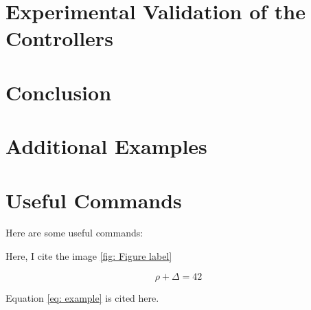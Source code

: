 \documentclass{rapportCS}
\begin{document}
\newpage

\section{Experimental Validation of the Controllers}
\lipsum[7-9]





\newpage

\section{Conclusion}
\lipsum[10-11]





\newpage

\section{Additional Examples}




\section{Useful Commands}

Here are some useful commands:



Here, I cite the image \ref{fig: Figure label}



\begin{equation} \label{eq: example}
\rho + \Delta = 42
\end{equation}

Equation \ref{eq: example} is cited here. 
\end{document}
